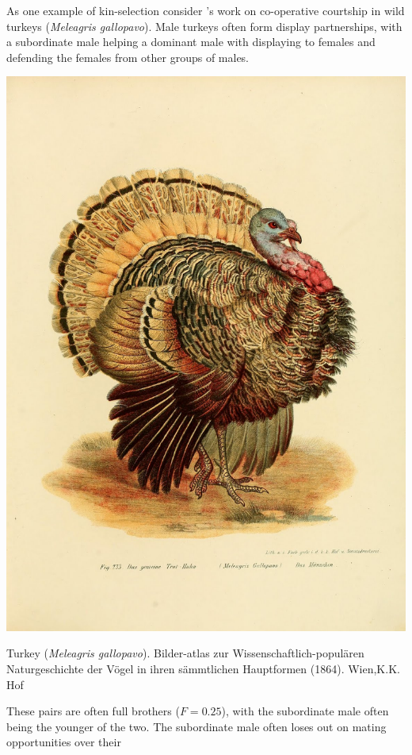 As one example of kin-selection consider \citet{krakauer2005kin}'s work on
co-operative courtship in wild turkeys ({\it Meleagris
  gallopavo}). Male turkeys often form display
partnerships, with a subordinate male helping a dominant male with
displaying to females and defending the females from other groups of males. \begin{marginfigure}
\begin{center}
\includegraphics[width= \textwidth]{illustration_images/Quant_gen/Turkey/turkey.jpg}
\end{center}
\caption{Turkey  ({\it Meleagris
  gallopavo}). Bilder-atlas zur Wissenschaftlich-populären
Naturgeschichte der Vögel in ihren sämmtlichen Hauptformen (1864). Wien,K.K. Hof } \label{fig:turkey}
\end{marginfigure}  These pairs are often full brothers ($F=0.25$),
with the subordinate male often being the younger of the two. The
subordinate male often loses out on mating opportunities over their
